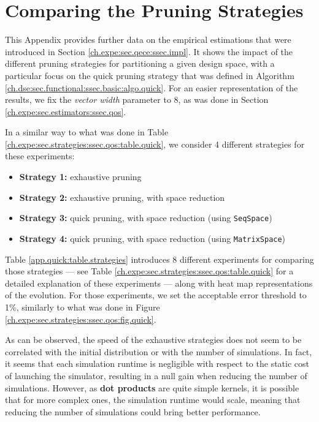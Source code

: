 \chapter{Comparing the Pruning Strategies}

This Appendix provides further data on the empirical  estimations that were introduced in Section \ref{ch.expe:sec.qece:ssec.impl}.
It shows the impact of the different pruning strategies for partitioning a given design space, with a particular focus on the quick pruning strategy that was defined in Algorithm \ref{ch.dse:sec.functional:ssec.basic:algo.quick}. 
For an easier representation of the results, we fix the {\it vector width} parameter to 8, as was done in Section \ref{ch.expe:sec.estimators:ssec.qos}.

In a similar way to what was done in Table \ref{ch.expe:sec.strategies:ssec.qos:table.quick}, we consider 4 different strategies for these experiments:
\begin{itemize}
    \item {\bf Strategy 1:} exhaustive pruning
    \item {\bf Strategy 2:} exhaustive pruning, with space reduction
    \item {\bf Strategy 3:} quick pruning, with space reduction (using \lstinline{SeqSpace})
    \item {\bf Strategy 4:} quick pruning, with space reduction (using \lstinline{MatrixSpace})
\end{itemize}

\vspace*{\fill}
\minilof

\clearpage

Table \ref{app.quick:table.strategies} introduces 8 different experiments for comparing those strategies --- see Table \ref{ch.expe:sec.strategies:ssec.qos:table.quick} for a detailed explanation of these experiments --- along with heat map representations of the  evolution.
For those experiments, we set the acceptable error threshold to 1\%, similarly to what was done in Figure \ref{ch.expe:sec.strategies:ssec.qos:fig.quick}.

As can be observed, the speed of the exhaustive strategies does not seem to be correlated with the initial distribution or with the number of simulations.
In fact, it seems that each simulation runtime is negligible with respect to the static cost of launching the simulator, resulting in a null gain when reducing the number of simulations.
However, as {\bf dot products} are quite simple kernels, it is possible that for more complex ones, the simulation runtime would scale, meaning that reducing the number of simulations could bring better performance.

